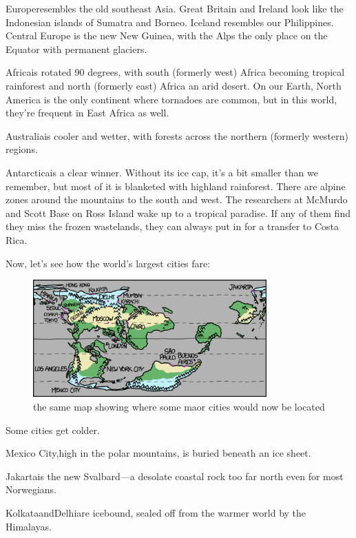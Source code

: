 {Europeresembles the old southeast Asia. Great Britain and Ireland look like the Indonesian islands of Sumatra and Borneo. Iceland resembles our Philippines. Central Europe is the new New Guinea, with the Alps the only place on the Equator with permanent glaciers.}

{Africais rotated 90 degrees, with south (formerly west) Africa becoming tropical rainforest and north (formerly east) Africa an arid desert. On our Earth, North America is the only continent where tornadoes are common, but in this world, they're frequent in East Africa as well.}

{Australiais cooler and wetter, with forests across the northern (formerly western) regions.}

{Antarcticais a clear winner. Without its ice cap, it’s a bit smaller than we remember, but most of it is blanketed with highland rainforest. There are alpine zones around the mountains to the south and west. The researchers at McMurdo and Scott Base on Ross Island wake up to a tropical paradise. If any of them find they miss the frozen wastelands, they can always put in for a transfer to Costa Rica.}

{Now, let’s see how the world’s largest cities fare:}

\begin{figure}[!htbp]
\centering
\includegraphics[scale=0.5, max width=0.8\textwidth]{imgs/a/10/cassini_cities.png}
\caption{the same map showing where some maor cities would now be located}
\end{figure}

{Some cities get colder.}

{Mexico City,high in the polar mountains, is buried beneath an ice sheet.}

{Jakartais the new Svalbard—a desolate coastal rock too far north even for most Norwegians.}

{KolkataandDelhiare icebound, sealed off from the warmer world by the Himalayas.}

